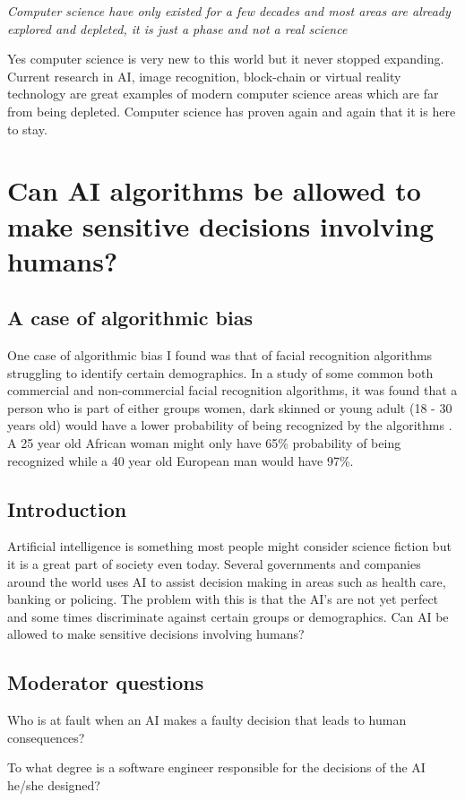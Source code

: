 \documentclass[11pt,a4paper]{article}
\begin{document}
\textit{Computer science have only existed for a few decades and most areas are already explored and depleted, it is just a phase and not a real science}

Yes computer science is very new to this world but it never stopped expanding. Current research in AI, image recognition, block-chain or
virtual reality technology are great examples of modern computer science areas which are far from being depleted. Computer science has proven
again and again that it is here to stay.  

\section{Can AI algorithms be allowed to make sensitive decisions involving humans?}
\subsection{A case of algorithmic bias}
One case of algorithmic bias I found was that of facial recognition algorithms struggling to identify certain demographics.
In a study of some common both commercial and non-commercial facial recognition algorithms, it was found that a person who
is part of either groups women, dark skinned or young adult (18 - 30 years old) would have a lower probability of being
recognized by the algorithms \cite{ai-bias}. A 25 year old African woman might only have 65\% probability of being recognized
while a 40 year old European man would have 97\%.   

\subsection{Introduction}
Artificial intelligence is something most people might consider science fiction but it is a great part of society even today.
Several governments and companies around the world uses AI to assist decision making in areas such as health care, banking or policing.
The problem with this is that the AI's are not yet perfect and some times discriminate against certain groups or demographics.
Can AI be allowed to make sensitive decisions involving humans?

\subsection{Moderator questions}
Who is at fault when an AI makes a faulty decision that leads to human consequences?

To what degree is a software engineer responsible for the decisions of the AI he/she designed?
\end{document}
